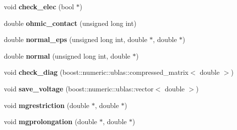 \begin{DoxyCompactItemize}
\item 
void {\bfseries check\+\_\+elec} (bool $\ast$)\hypertarget{classSolver_a9e0c1178a23582e0b281290f73ae871a}{}\label{classSolver_a9e0c1178a23582e0b281290f73ae871a}

\item 
double {\bfseries ohmic\+\_\+contact} (unsigned long int)\hypertarget{classSolver_a7d1087ed448131f4eb83c76f8a962365}{}\label{classSolver_a7d1087ed448131f4eb83c76f8a962365}

\item 
double {\bfseries normal\+\_\+eps} (unsigned long int, double $\ast$, double $\ast$)\hypertarget{classSolver_a36cdb7a42a13d2f197b6f8e6479a7b8c}{}\label{classSolver_a36cdb7a42a13d2f197b6f8e6479a7b8c}

\item 
double {\bfseries normal} (unsigned long int, double $\ast$)\hypertarget{classSolver_a40bb7bbd0cfb364aa4df0bd431fd9ee0}{}\label{classSolver_a40bb7bbd0cfb364aa4df0bd431fd9ee0}

\item 
void {\bfseries check\+\_\+diag} (boost\+::numeric\+::ublas\+::compressed\+\_\+matrix$<$ double $>$)\hypertarget{classSolver_a42587f1a50e213322cc70c4083b37682}{}\label{classSolver_a42587f1a50e213322cc70c4083b37682}

\item 
void {\bfseries save\+\_\+voltage} (boost\+::numeric\+::ublas\+::vector$<$ double $>$)\hypertarget{classSolver_a1e1374c106d3b0ffaff3f02851e69ca1}{}\label{classSolver_a1e1374c106d3b0ffaff3f02851e69ca1}

\item 
void {\bfseries mgrestriction} (double $\ast$, double $\ast$)\hypertarget{classSolver_a20e94820139dd1e3876d8e7ba6d9a6e9}{}\label{classSolver_a20e94820139dd1e3876d8e7ba6d9a6e9}

\item 
void {\bfseries mgprolongation} (double $\ast$, double $\ast$)\hypertarget{classSolver_a0ba739221bfa49be6e8619325c3c612b}{}\label{classSolver_a0ba739221bfa49be6e8619325c3c612b}

\end{DoxyCompactItemize}

